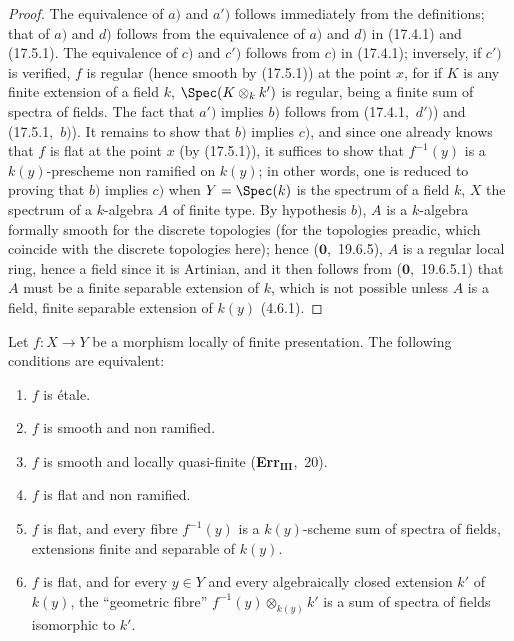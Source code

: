 \begin{proof}
The equivalence of $a)$ and $a')$ follows immediately from the definitions; that of $a)$ and $d)$ follows from the equivalence of $a)$ and $d)$ in (17.4.1) and (17.5.1).
The equivalence of $c)$ and $c')$ follows from $c)$ in (17.4.1); inversely, if $c')$ is verified, $f$ is regular (hence smooth by (17.5.1)) at the point $x$, for if $K$ is any finite extension of a field $k$, $\Spec(K\otimes_k k')$ is regular, being a finite sum of spectra of fields.
The fact that $a')$ implies $b)$ follows from (17.4.1,~$d')$) and (17.5.1,~$b)$).
It remains to show that $b)$ implies $c)$, and since one already knows that $f$ is flat at the point $x$ (by (17.5.1)), it suffices to show that $f^{-1}(y)$ is a $k(y)$-prescheme non ramified on $k(y)$; in other words, one is reduced to proving that $b)$ implies $c)$ when $Y=\Spec(k)$ is the spectrum of a field $k$, $X$ the spectrum of a $k$-algebra $A$ of finite type.
By hypothesis $b)$, $A$ is a $k$-algebra formally smooth for the discrete topologies (for the topologies preadic, which coincide with the discrete topologies here); hence ($\mathbf{0}$,~19.6.5), $A$ is a regular local ring, hence a field since it is Artinian, and it then follows from ($\mathbf{0}$,~19.6.5.1) that $A$ must be a finite separable extension of $k$, which is not possible unless $A$ is a field, finite separable extension of $k(y)$ (4.6.1).
\end{proof}

\begin{corollary}[17.6.2]
\label{IV.17.6.2}
Let $f:X\to Y$ be a morphism locally of finite presentation.
The following conditions are equivalent:
\begin{enumerate}[label=(\alph*)]
  \item $f$ is \'etale.
  \item[a')] $f$ is smooth and non ramified.
  \item $f$ is smooth and locally quasi-finite (\textbf{Err}$_\textbf{III}$,~20).
  \item $f$ is flat and non ramified.
  \item[c')] $f$ is flat, and every fibre $f^{-1}(y)$ is a $k(y)$-scheme sum of spectra of fields, extensions finite and separable of $k(y)$.
  \item[c'')] $f$ is flat, and for every $y\in Y$ and every algebraically closed extension $k'$ of $k(y)$, the ``geometric fibre'' $f^{-1}(y)\otimes_{k(y)}k'$ is a sum of spectra of fields isomorphic to $k'$.
\end{enumerate}
\end{corollary}

